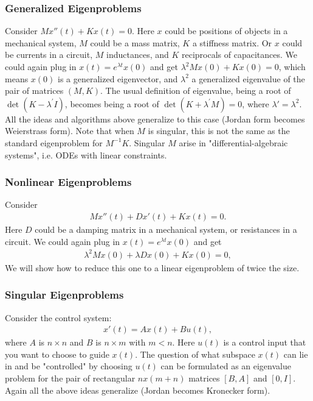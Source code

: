 \documentclass[11pt]{article}
\numberwithin{equation}{section}
\begin{document}
\subsubsection{Generalized Eigenproblems}
Consider $M x''(t) + Kx(t) = 0$. Here $x$ could be positions of objects in a mechanical system, $M$ could be a mass matrix, $K$ a stiffness matrix. 
Or $x$ could be currents in a circuit,  $M$ inductances, and $K$ reciprocals of capacitances. We could again plug in $x(t) = e^{\lambda t} x(0)$ and get 
$\lambda^2 Mx(0) + Kx(0) = 0$,  which means $x(0)$ is a generalized eigenvector,  and $\lambda^2$ a generalized eigenvalue of the pair of matrices $(M,K)$. 
The usual definition of eigenvalue,  being a root of $\operatorname{det}(K - \lambda^\prime I)$, becomes being a root of 
$\operatorname{det}(K + \lambda^\prime M ) = 0$, where $\lambda ' = \lambda^2$.
All the ideas and algorithms above generalize to this case (Jordan form becomes Weierstrass form). Note that when $M$ is singular, 
this is not the same as the standard eigenproblem for $M^{-1}K$. Singular $M$ arise in "differential-algebraic systems", i.e. ODEs with linear constraints.

\subsubsection{Nonlinear Eigenproblems}
Consider \begin{align*}
    Mx''(t) + Dx'(t) + Kx(t) = 0.
\end{align*}
Here $D$ could be a damping matrix in a mechanical system, or resistances in a circuit. We could again plug in $x(t) = e^{\lambda t} x(0)$ and get \begin{align*}
    \lambda^2 Mx(0) + \lambda Dx(0) + Kx(0) = 0,
\end{align*}
We will show how to reduce this one to a linear eigenproblem of twice the size.

\subsubsection{Singular Eigenproblems}
Consider the control system: \begin{align*}
    x'(t) = Ax(t) + Bu(t),
\end{align*}
where $A$ is $n \times n$ and $B$ is $n \times m$ with $m < n$. Here $u(t)$ is a control input that you want to choose to guide $x(t)$. 
The question of what subspace $x(t)$ can lie in and be "controlled" by choosing $u(t)$ can be formulated as an eigenvalue problem for the pair of rectangular 
$n x (m+n)$ matrices $[B,A]$ and $[0,I]$. Again all the above ideas generalize (Jordan becomes Kronecker form).
\end{document}
